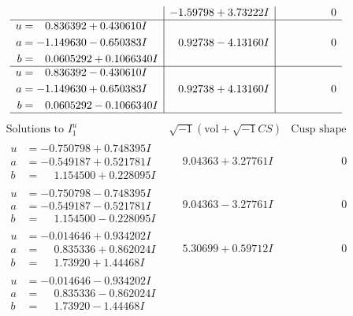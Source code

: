 \documentclass[1p]{elsarticle_modified}
\theoremstyle{definition}
\newcommand{\I}{\sqrt{-1}}
\begin{document}
$$\begin{array}{c|c|c}
 & -1.59798 + 3.73222 I & \phantom{-0.000000 } 0 \\ \hline\begin{aligned}
u &= \phantom{-}0.836392 + 0.430610 I \\
a &= -1.149630 - 0.650383 I \\
b &= \phantom{-}0.0605292 + 0.1066340 I\end{aligned}
 & \phantom{-}0.92738 - 4.13160 I & \phantom{-0.000000 } 0 \\ \hline\begin{aligned}
u &= \phantom{-}0.836392 - 0.430610 I \\
a &= -1.149630 + 0.650383 I \\
b &= \phantom{-}0.0605292 - 0.1066340 I\end{aligned}
 & \phantom{-}0.92738 + 4.13160 I & \phantom{-0.000000 } 0\\
 \hline 
 \end{array}$$\newpage$$\begin{array}{c|c|c}  
\text{Solutions to }I^u_{1}& \I (\text{vol} + \sqrt{-1}CS) & \text{Cusp shape}\\
 \hline 
\begin{aligned}
u &= -0.750798 + 0.748395 I \\
a &= -0.549187 + 0.521781 I \\
b &= \phantom{-}1.154500 + 0.228095 I\end{aligned}
 & \phantom{-}9.04363 + 3.27761 I & \phantom{-0.000000 } 0 \\ \hline\begin{aligned}
u &= -0.750798 - 0.748395 I \\
a &= -0.549187 - 0.521781 I \\
b &= \phantom{-}1.154500 - 0.228095 I\end{aligned}
 & \phantom{-}9.04363 - 3.27761 I & \phantom{-0.000000 } 0 \\ \hline\begin{aligned}
u &= -0.014646 + 0.934202 I \\
a &= \phantom{-}0.835336 + 0.862024 I \\
b &= \phantom{-}1.73920 + 1.44468 I\end{aligned}
 & \phantom{-}5.30699 + 0.59712 I & \phantom{-0.000000 } 0 \\ \hline\begin{aligned}
u &= -0.014646 - 0.934202 I \\
a &= \phantom{-}0.835336 - 0.862024 I \\
b &= \phantom{-}1.73920 - 1.44468 I\end{aligned}

\end{array}$$
\end{document}
